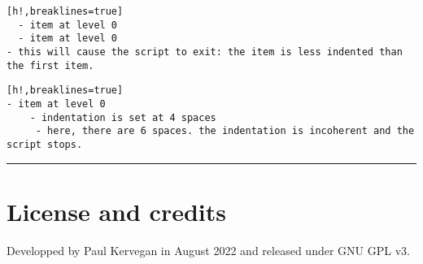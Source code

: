 \documentclass[a4paper, 12pt, twoside]{book}
\begin{document}
\begin{Verbatim}[h!,breaklines=true]
  - item at level 0
  - item at level 0
- this will cause the script to exit: the item is less indented than the first item.
\end{Verbatim}

\begin{Verbatim}[h!,breaklines=true]
- item at level 0
	- indentation is set at 4 spaces
	 - here, there are 6 spaces. the indentation is incoherent and the script stops.
\end{Verbatim}

\par\noindent\rule{\linewidth}{0.4pt}
\section*{License and credits}

Developped by Paul Kervegan in August 2022 and released under GNU GPL v3.


\clearpage
\tableofcontents
\end{document}
